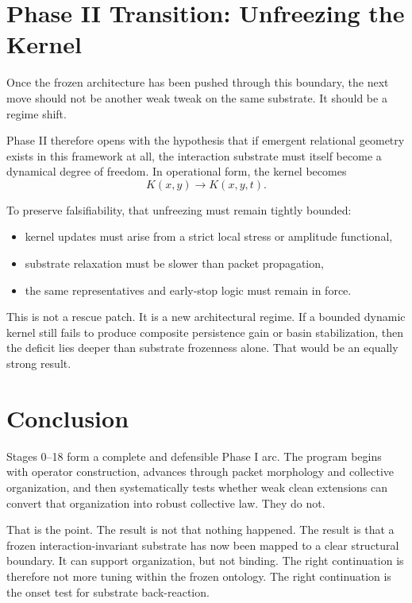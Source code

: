 \documentclass[11pt]{article}
\begin{document}
\section{Phase II Transition: Unfreezing the Kernel}

Once the frozen architecture has been pushed through this boundary, the next move should not be another weak tweak on the same substrate. It should be a regime shift.

Phase II therefore opens with the hypothesis that if emergent relational geometry exists in this framework at all, the interaction substrate must itself become a dynamical degree of freedom. In operational form, the kernel becomes
\[
K(x,y) \rightarrow K(x,y,t).
\]

To preserve falsifiability, that unfreezing must remain tightly bounded:
\begin{itemize}
\item kernel updates must arise from a strict local stress or amplitude functional,
\item substrate relaxation must be slower than packet propagation,
\item the same representatives and early-stop logic must remain in force.
\end{itemize}

This is not a rescue patch. It is a new architectural regime. If a bounded dynamic kernel still fails to produce composite persistence gain or basin stabilization, then the deficit lies deeper than substrate frozenness alone. That would be an equally strong result.

\section{Conclusion}

Stages 0--18 form a complete and defensible Phase I arc. The program begins with operator construction, advances through packet morphology and collective organization, and then systematically tests whether weak clean extensions can convert that organization into robust collective law. They do not.

That is the point. The result is not that nothing happened. The result is that a frozen interaction-invariant substrate has now been mapped to a clear structural boundary. It can support organization, but not binding. The right continuation is therefore not more tuning within the frozen ontology. The right continuation is the onset test for substrate back-reaction.
\end{document}
